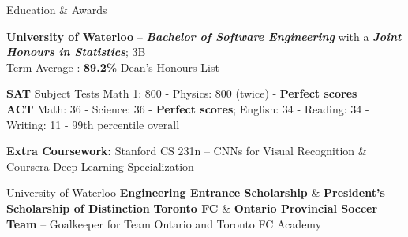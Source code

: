 \documentclass{resume} %
\begin{document}
\begin{rSection}{Education \& Awards}

\textbf{University of Waterloo} -- \textbf{\textit{Bachelor of Software Engineering}} with a \textbf{\textit{Joint Honours in Statistics}}; 3B \\
Term Average : \textbf{89.2}\textbf{\% } Dean's Honours List
\item \textbf{SAT} Subject Tests Math 1: 800 - Physics: 800 (twice) -  \textbf{Perfect scores} \\ \textbf{ACT} Math: 36 - Science: 36 - \textbf{Perfect scores}; English: 34 - Reading: 34 - Writing: 11 - 99th percentile overall

\textbf{Extra Coursework:} Stanford CS 231n -- CNNs for Visual Recognition \& Coursera Deep Learning Specialization 

University of Waterloo \textbf{Engineering Entrance Scholarship} \& \textbf{President's Scholarship of Distinction} 
\textbf{Toronto FC} \& \textbf{Ontario Provincial Soccer Team} -- Goalkeeper for Team Ontario and Toronto FC Academy  

\end{rSection}


\end{document}
